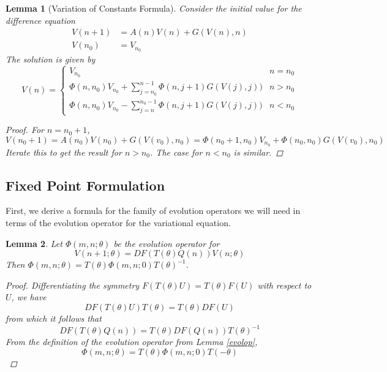 \documentclass[12pt]{article}
\newtheorem{lemma}{Lemma}
\begin{document}
\begin{lemma}[Variation of Constants Formula]\label{VOC}
Consider the initial value for the difference equation
\begin{align*}
V(n+1) &= A(n) V(n) + G(V(n), n) \\
V(n_0) &= V_{n_0}
\end{align*}
The solution is given by
\begin{equation}\label{VOCformula}
V(n) = 
\begin{cases}
V_{n_0} & n = n_0 \\
\Phi(n, n_0) V_{n_0} + \sum_{j = n_0}^{n-1} \Phi(n, j+1) G(V(j), j)) & n > n_0 \\
\Phi(n, n_0) V_{n_0} - \sum_{j = n}^{n_0-1} \Phi(n, j+1) G(V(j), j)) & n < n_0 
\end{cases}
\end{equation}
\begin{proof}
For $n = n_0 + 1$,
\[
V(n_0 + 1) = A(n_0) V(n_0) + G(V(v_0), n_0) = \Phi(n_0+1, n_0) V_{n_0} + \Phi(n_0, n_0) G(V(v_0), n_0)
\]
Iterate this to get the result for $n > n_0$. The case for $n < n_0$ is similar.
\end{proof}
\end{lemma}

\subsection{Fixed Point Formulation}

First, we derive a formula for the family of evolution operators we will need in terms of the evolution operator for the variational equation.

\begin{lemma}\label{thetaevol}
Let $\Phi(m, n; \theta)$ be the evolution operator for 
\begin{equation}\label{Vtheta}
V(n+1; \theta) = DF(T(\theta)Q(n)) V(n; \theta) 
\end{equation}
Then $\Phi(m, n; \theta) = T(\theta)\Phi(m, n; 0)T(\theta)^{-1}$.
\begin{proof}
Differentiating the symmetry $F(T(\theta)U) = T(\theta)F(U)$ with respect to $U$, we have 
\[
DF(T(\theta)U)T(\theta) = T(\theta)DF(U)
\]
from which it follows that
\begin{equation}\label{DFtheta}
DF(T(\theta)Q(n)) = T(\theta)DF(Q(n))T(\theta)^{-1}
\end{equation}
From the definition of the evolution operator from Lemma \ref{evolop},
\[
\Phi(m, n; \theta) = T(\theta)\Phi(m, n; 0)T(-\theta)
\]
\end{proof}
\end{lemma}
\end{document}

